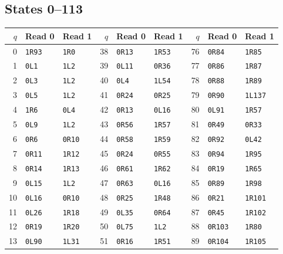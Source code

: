 \clearpage
\subsection*{States 0--113}
\begin{center}\small
\setlength{\tabcolsep}{8pt}
\renewcommand{\arraystretch}{1.16}
\begin{tabular}{rll@{\hspace{9mm}}rll@{\hspace{9mm}}rll}
\toprule
$q$ & Read 0 & Read 1 & $q$ & Read 0 & Read 1 & $q$ & Read 0 & Read 1 \\
\midrule
0 & \texttt{1R93} & \texttt{1R0} & 38 & \texttt{0R13} & \texttt{1R53} & 76 & \texttt{0R84} & \texttt{1R85} \\
1 & \texttt{0L1} & \texttt{1L2} & 39 & \texttt{0L11} & \texttt{0R36} & 77 & \texttt{0R86} & \texttt{1R87} \\
2 & \texttt{0L3} & \texttt{1L2} & 40 & \texttt{0L4} & \texttt{1L54} & 78 & \texttt{0R88} & \texttt{1R89} \\
3 & \texttt{0L5} & \texttt{1L2} & 41 & \texttt{0R24} & \texttt{0R25} & 79 & \texttt{0R90} & \texttt{1L137} \\
4 & \texttt{1R6} & \texttt{0L4} & 42 & \texttt{0R13} & \texttt{0L16} & 80 & \texttt{0L91} & \texttt{1R57} \\
5 & \texttt{0L9} & \texttt{1L2} & 43 & \texttt{0R56} & \texttt{1R57} & 81 & \texttt{0R49} & \texttt{0R33} \\
6 & \texttt{0R6} & \texttt{0R10} & 44 & \texttt{0R58} & \texttt{1R59} & 82 & \texttt{0R92} & \texttt{0L42} \\
7 & \texttt{0R11} & \texttt{1R12} & 45 & \texttt{0R24} & \texttt{0R55} & 83 & \texttt{0R94} & \texttt{1R95} \\
8 & \texttt{0R14} & \texttt{1R13} & 46 & \texttt{0R61} & \texttt{1R62} & 84 & \texttt{0R19} & \texttt{1R65} \\
9 & \texttt{0L15} & \texttt{1L2} & 47 & \texttt{0R63} & \texttt{0L16} & 85 & \texttt{0R89} & \texttt{1R98} \\
10 & \texttt{0L16} & \texttt{0R10} & 48 & \texttt{0R25} & \texttt{1R48} & 86 & \texttt{0R21} & \texttt{1R101} \\
11 & \texttt{0L26} & \texttt{1R18} & 49 & \texttt{0L35} & \texttt{0R64} & 87 & \texttt{0R45} & \texttt{1R102} \\
12 & \texttt{0R19} & \texttt{1R20} & 50 & \texttt{0L75} & \texttt{1L2} & 88 & \texttt{0R103} & \texttt{1R80} \\
13 & \texttt{0L90} & \texttt{1L31} & 51 & \texttt{0R16} & \texttt{1R51} & 89 & \texttt{0R104} & \texttt{1R105} \\

\end{tabular}
\end{center}
